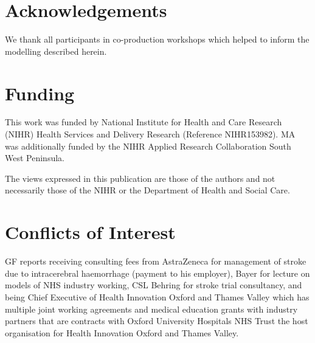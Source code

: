 \section*{Acknowledgements}

We thank all participants in co-production workshops which helped to inform the modelling described herein.

\section*{Funding}

This work was funded by National Institute for Health and Care Research (NIHR) Health Services and Delivery Research (Reference NIHR153982). MA was additionally funded by the NIHR Applied Research Collaboration South West Peninsula.

The views expressed in this publication are those of the authors and not necessarily those
of the NIHR or the Department of Health and Social Care.

\section*{Conflicts of Interest}

GF reports receiving consulting fees from AstraZeneca for management of stroke due to intracerebral haemorrhage (payment to his employer), Bayer for lecture on models of NHS industry working, CSL Behring for stroke trial consultancy, and being Chief Executive of Health Innovation Oxford and Thames Valley which has multiple joint working agreements and medical education grants with industry partners that are contracts with Oxford University Hospitals NHS Trust the host organisation for Health Innovation Oxford and Thames Valley.
